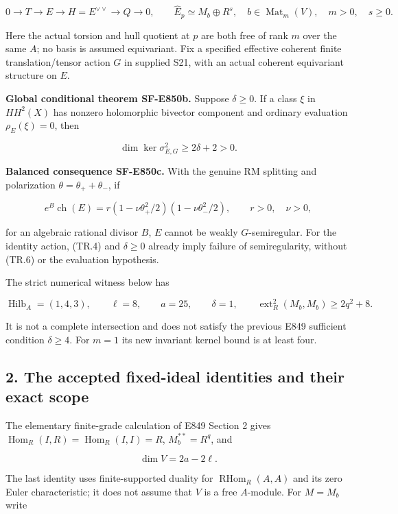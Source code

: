 \[
 0\longrightarrow T\longrightarrow E\longrightarrow
 H=E^{\vee\vee}\longrightarrow Q\longrightarrow0,
 \qquad
 \widehat E_p\simeq M_b\oplus R^s,\quad
 b\in\operatorname{Mat}_m(V),\quad m>0,\quad s\ge0.
 \tag{TR.4}
\]

Here the actual torsion and hull quotient at \(p\) are both free of rank \(m\)
over the same \(A\); no basis is assumed equivariant. Fix a specified effective
coherent finite translation/tensor action \(G\) in supplied S21, with an actual
coherent equivariant structure on \(E\).

\textbf{Global conditional theorem SF-E850b.} Suppose \(\delta\ge0\). If a class
\(\xi\) in \(HH^2(X)\) has nonzero holomorphic bivector component and ordinary
evaluation \(\rho_E(\xi)=0\), then

\[
                 \dim\ker\sigma^2_{E,G}\ge2\delta+2>0.
 \tag{TR.5}
\]

\textbf{Balanced consequence SF-E850c.} With the genuine RM splitting and
polarization \(\theta=\theta_++\theta_-\), if

\[
 e^B\operatorname{ch}(E)
     =r(1-\nu\theta_+^2/2)(1-\nu\theta_-^2/2),
 \qquad r>0,\quad \nu>0,
 \tag{TR.6}
\]

for an algebraic rational divisor \(B\), \(E\) cannot be weakly \(G\)-semiregular.
For the identity action, (TR.4) and \(\delta\ge0\) already imply failure of
semiregularity, without (TR.6) or the evaluation hypothesis.

The strict numerical witness below has

\[
  \operatorname{Hilb}_A=(1,4,3),\qquad
  \ell=8,\qquad a=25,\qquad\delta=1,
  \qquad\operatorname{ext}^2_R(M_b,M_b)\ge2q^2+8.
 \tag{TR.7}
\]

It is not a complete intersection and does not satisfy the previous
E849 sufficient condition \(\delta\ge4\). For \(m=1\) its new invariant kernel
bound is at least four.

\subsection{2. The accepted fixed-ideal identities and their exact scope}\label{SF-E850:s2}

The elementary finite-grade calculation of E849 Section 2 gives
\(\operatorname{Hom}_R(I,R)=\operatorname{Hom}_R(I,I)=R\), \(M_b^{**}=R^q\), and

\[
  \dim V=2a-2\ell.
 \tag{TR.8}
\]

The last identity uses finite-supported duality for \(\operatorname{RHom}_R(A,A)\) and its
zero Euler characteristic; it does not assume that \(V\) is a free \(A\)-module.
For \(M=M_b\) write

